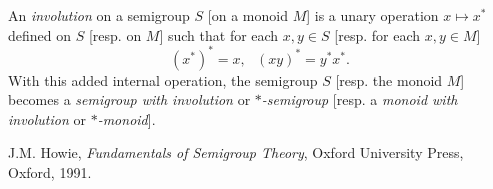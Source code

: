 \documentclass[12pt]{article}
\begin{document}
An \emph{involution} on a semigroup $S$ [on a monoid $M$] is a unary operation $x\mapsto x^*$ defined on $S$ [resp. on $M$] such that for each $x,y\in S$ [resp. for each $x,y\in M$] $$(x^*)^*=x,\ \ \ (xy)^*=y^*x^*.$$
With this added internal operation, the semigroup $S$ [resp. the monoid $M$] becomes a \emph{semigroup with involution} or \emph{$*$-semigroup}  [resp. a \emph{monoid with involution} or \emph{$*$-monoid}].

\begin{thebibliography}{9}
 J.M. Howie, \emph{Fundamentals of Semigroup Theory}, Oxford University Press, Oxford, 1991.
\end{thebibliography}
\end{document}
